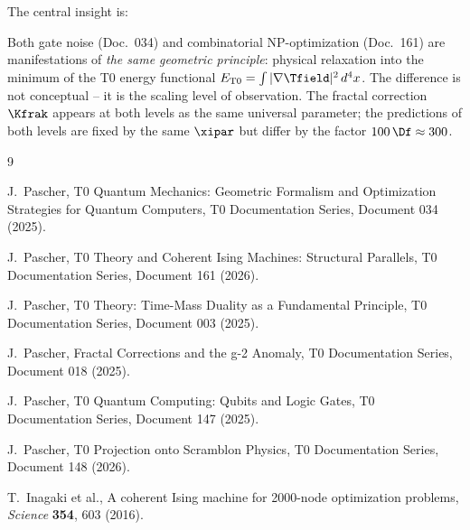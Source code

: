 The central insight is:

\begin{revolutionary}
    Both gate noise (Doc.\ 034) and combinatorial NP-optimization (Doc.\ 161) are
    manifestations of \emph{the same geometric principle}: physical relaxation into
    the minimum of the T0 energy functional
    $E_{\text{T0}} = \int |\nabla \Tfield|^2 \, d^4x$.
    The difference is not conceptual -- it is the scaling level of observation.
    The fractal correction $\Kfrak$ appears at both levels as the same universal
    parameter; the predictions of both levels are fixed by the same $\xipar$ but differ by the factor $100\,\Df \approx 300$.
\end{revolutionary}

\begin{thebibliography}{9}

J.~Pascher,
\newblock T0 Quantum Mechanics: Geometric Formalism and Optimization Strategies
for Quantum Computers,
\newblock T0 Documentation Series, Document 034 (2025).

J.~Pascher,
\newblock T0 Theory and Coherent Ising Machines: Structural Parallels,
\newblock T0 Documentation Series, Document 161 (2026).

J.~Pascher,
\newblock T0 Theory: Time-Mass Duality as a Fundamental Principle,
\newblock T0 Documentation Series, Document 003 (2025).

J.~Pascher,
\newblock Fractal Corrections and the g-2 Anomaly,
\newblock T0 Documentation Series, Document 018 (2025).

J.~Pascher,
\newblock T0 Quantum Computing: Qubits and Logic Gates,
\newblock T0 Documentation Series, Document 147 (2025).

J.~Pascher,
\newblock T0 Projection onto Scramblon Physics,
\newblock T0 Documentation Series, Document 148 (2026).

T.~Inagaki et al.,
\newblock A coherent Ising machine for 2000-node optimization problems,
\newblock \emph{Science} \textbf{354}, 603 (2016).

\end{thebibliography}

